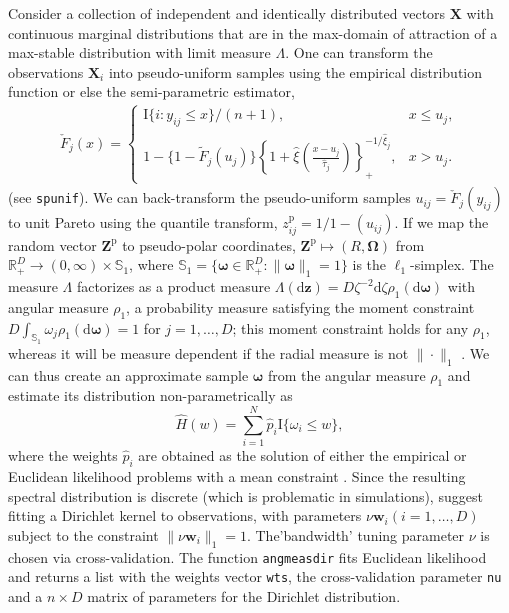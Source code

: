 \documentclass[]{book}
\begin{document}
Consider a collection of independent and identically distributed vectors \(\boldsymbol{X}\) with continuous marginal distributions that are in the max-domain of attraction of a max-stable distribution with limit measure \(\Lambda\). One can transform the observations \(\boldsymbol{X}_i\) into pseudo-uniform samples using the empirical distribution function or else the semi-parametric estimator,
\begin{align}
 \check{F}_j(x) =
\begin{cases}
\mathrm{I}\{i: y_{ij} \leq x\}/(n+1), &  x \leq u_j,\\
1-\{1-\tilde{F}_j(u_j)\}\left\{1+\hat{\xi}\left(\frac{x-u_j}{\hat{\tau}_j}\right)\right\}^{-1/\hat{\xi}_j}_{+}, & x >u_j.
\end{cases}
\end{align}
(see \texttt{spunif}). We can back-transform the pseudo-uniform samples \(u_{ij} = \check{F}_j(y_{ij})\) to unit Pareto using the quantile transform,
\(z_{ij}^{\mathrm{p}} = 1/1-(u_{ij})\). If we map the random vector \(\boldsymbol{Z}^{\mathrm{p}}\) to pseudo-polar coordinates, \(\boldsymbol{Z}^{\mathrm{p}} \mapsto (R, \boldsymbol{\Omega})\) from \(\mathbb{R}^D_{+} \to (0, \infty) \times \mathbb{S}_1\), where \(\mathbb{S}_1=\{ \boldsymbol{\omega} \in \mathbb{R}^D_{+}: \|\boldsymbol{\omega}\|_1=1\}\) is the \(\ell_1\)-simplex. The measure \(\Lambda\) factorizes as a product measure \(\Lambda(\mathrm{d}\boldsymbol{z}) = D \zeta^{-2}\mathrm{d}\zeta \rho_1(\mathrm{d}\boldsymbol{\omega})\) with angular measure \(\rho_1\), a probability measure satisfying the moment constraint \(D\int_{\mathbb{S}_1} \omega_j \rho_1(\mathrm{d}\boldsymbol{\omega})=1\) for \(j=1, \ldots, D\); this moment constraint holds for any \(\rho_1\), whereas it will be measure dependent if the radial measure is not \(\|\cdot \|_1\) \citep{Einmahl:2009}.
We can thus create an approximate sample \(\boldsymbol{\omega}\) from the angular measure \(\rho_1\) and estimate its distribution non-parametrically as
\[\hat{H}(w) = \sum_{i=1}^N \hat{p}_i\mathrm{I}\{\omega_i \leq w\},\]
where the weights \(\hat{p}_i\) are obtained as the solution of either the empirical or Euclidean likelihood problems with a mean constraint \citep[\citet{Einmahl:2009}]{deCarvalho:2013}.
Since the resulting
spectral distribution is discrete (which is problematic in simulations), \citet{deCarvalho:2013} suggest fitting a Dirichlet kernel to
observations, with parameters \(\nu \boldsymbol{w}_i (i=1, \ldots, D)\) subject to the constraint \(\|\nu\boldsymbol{w}_{i}\|_1=1\). The'bandwidth' tuning parameter \(\nu\) is chosen via cross-validation. The function \texttt{angmeasdir} fits Euclidean likelihood and returns a list with the weights vector \texttt{wts}, the cross-validation parameter \texttt{nu} and a \(n \times D\) matrix of parameters for the Dirichlet distribution.
\end{document}
